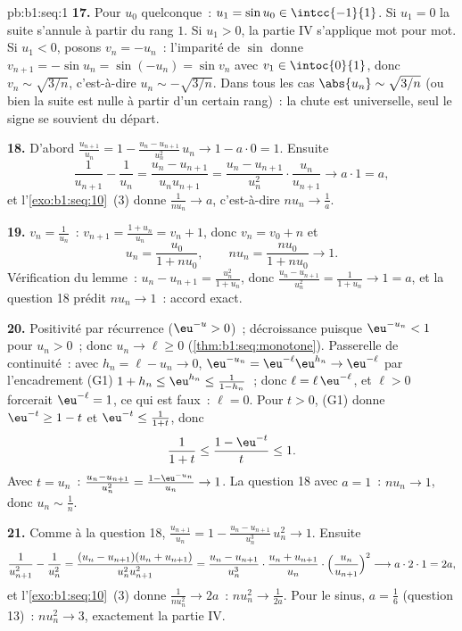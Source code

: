 \begin{solution}{pb:b1:seq:1}
\textbf{17.} Pour $u_0$ quelconque~: $u_1 = \sin u_0 \in
\intcc{-1}{1}$. Si $u_1 = 0$ la suite s'annule à partir du rang $1$.
Si $u_1 > 0$, la partie IV s'applique mot pour mot. Si $u_1 < 0$,
posons $v_n = -u_n$~: l'imparité de $\sin$ donne $v_{n+1} = -\sin u_n
= \sin(-u_n) = \sin v_n$ avec $v_1 \in \intoc{0}{1}$, donc $v_n \sim
\sqrt{3/n}$, c'est-à-dire $u_n \sim -\sqrt{3/n}$. Dans tous les cas
$\abs{u_n} \sim \sqrt{3/n}$ (ou bien la suite est nulle à partir d'un
certain rang)~: la chute est universelle, seul le signe se souvient du
départ.

\textbf{18.} D'abord $\frac{u_{n+1}}{u_n} = 1 - \frac{u_n -
u_{n+1}}{u_n^2}\,u_n \to 1 - a \cdot 0 = 1$. Ensuite
\[
\frac{1}{u_{n+1}} - \frac{1}{u_n}
= \frac{u_n - u_{n+1}}{u_n u_{n+1}}
= \frac{u_n - u_{n+1}}{u_n^2}\cdot\frac{u_n}{u_{n+1}}
\longrightarrow a \cdot 1 = a ,
\]
et l'\cref{exo:b1:seq:10}~(3) donne $\frac{1}{n u_n} \to a$,
c'est-à-dire $n u_n \to \frac1a$.

\textbf{19.} $v_n = \frac{1}{u_n}$~: $v_{n+1} = \frac{1 +
u_n}{u_n} = v_n + 1$, donc $v_n = v_0 + n$ et
\[
u_n = \frac{u_0}{1 + n u_0} , \qquad
n u_n = \frac{n u_0}{1 + n u_0} \longrightarrow 1 .
\]
Vérification du lemme~: $u_n - u_{n+1} = \frac{u_n^2}{1 + u_n}$, donc
$\frac{u_n - u_{n+1}}{u_n^2} = \frac{1}{1 + u_n} \to 1 = a$, et la
question 18 prédit $n u_n \to 1$~: accord exact.

\textbf{20.} Positivité par récurrence ($\eu^{-u} > 0$)~;
décroissance puisque $\eu^{-u_n} < 1$ pour $u_n > 0$~; donc $u_n \to
\ell \geq 0$ (\cref{thm:b1:seq:monotone}). Passerelle de continuité~:
avec $h_n = \ell - u_n \to 0$, $\eu^{-u_n} = \eu^{-\ell}
\eu^{h_n} \to \eu^{-\ell}$ par l'encadrement (G1) $1 + h_n \leq
\eu^{h_n} \leq \frac{1}{1 - h_n}$~; donc $\ell = \ell\,
\eu^{-\ell}$, et $\ell > 0$ forcerait $\eu^{-\ell} = 1$, ce qui est
faux~: $\ell = 0$. Pour $t > 0$, (G1) donne $\eu^{-t} \geq 1 - t$
et $\eu^{-t} \leq \frac{1}{1 + t}$, donc
\[
\frac{1}{1 + t} \leq \frac{1 - \eu^{-t}}{t} \leq 1 .
\]
Avec $t = u_n$~: $\frac{u_n - u_{n+1}}{u_n^2} = \frac{1 -
\eu^{-u_n}}{u_n} \to 1$. La question 18 avec $a = 1$~: $n u_n \to
1$, donc $u_n \sim \frac1n$.

\textbf{21.} Comme à la question 18, $\frac{u_{n+1}}{u_n} = 1 -
\frac{u_n - u_{n+1}}{u_n^3}\,u_n^2 \to 1$. Ensuite
\[
\frac{1}{u_{n+1}^2} - \frac{1}{u_n^2}
= \frac{(u_n - u_{n+1})(u_n + u_{n+1})}{u_n^2 u_{n+1}^2}
= \frac{u_n - u_{n+1}}{u_n^3}\cdot
\frac{u_n + u_{n+1}}{u_n}\cdot
\Bigl(\frac{u_n}{u_{n+1}}\Bigr)^2
\longrightarrow a \cdot 2 \cdot 1 = 2a ,
\]
et l'\cref{exo:b1:seq:10}~(3) donne $\frac{1}{n u_n^2} \to 2a$~:
$n u_n^2 \to \frac{1}{2a}$. Pour le sinus, $a = \frac16$
(question 13)~: $n u_n^2 \to 3$, exactement la partie IV.


\end{solution}
